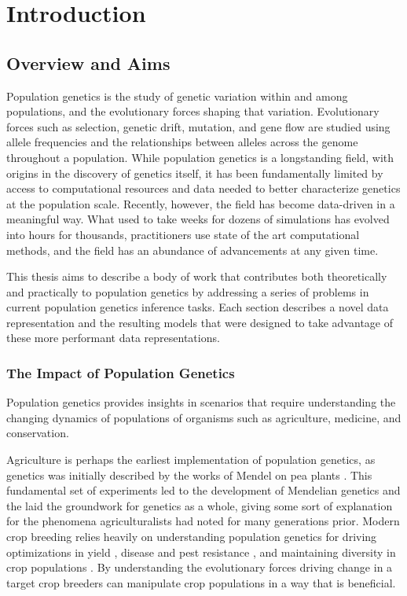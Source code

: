 \chapter{Introduction}

\section{Overview and Aims}

Population genetics is the study of genetic variation within and among populations, and the evolutionary forces shaping that variation. Evolutionary forces such as selection, genetic drift, mutation, and gene flow are studied using allele frequencies and the relationships between alleles across the genome throughout a population. While population genetics is a longstanding field, with origins in the discovery of genetics itself, it has been fundamentally limited by access to computational resources and data needed to better characterize genetics at the population scale. Recently, however, the field has become data-driven in a meaningful way. What used to take weeks for dozens of simulations has evolved into hours for thousands, practitioners use state of the art computational methods, and the field has an abundance of advancements at any given time.

This thesis aims to describe a body of work that contributes both theoretically and practically to population genetics by addressing a series of problems in current population genetics inference tasks. Each section describes a novel data representation and the resulting models that were designed to take advantage of these more performant data representations.

\subsection{The Impact of Population Genetics}

Population genetics provides insights in scenarios that require understanding the changing dynamics of populations of organisms such as agriculture, medicine, and conservation.

Agriculture is perhaps the earliest implementation of population genetics, as genetics was initially described by the works of Mendel on pea plants \cite{mendel_versuche_1866}. This fundamental set of experiments led to the development of Mendelian genetics and the laid the groundwork for genetics as a whole, giving some sort of explanation for the phenomena agriculturalists had noted for many generations prior. Modern crop breeding relies heavily on understanding population genetics for driving optimizations in yield \cite{maccaferri2008quantitative}, disease and pest resistance \cite{poland2009shades, derbyshireBioinformaticDetectionPositive2020, hawkinsEvolutionaryOriginsPesticide2019}, and maintaining diversity in crop populations \cite{hamblin_population_2011}. By understanding the evolutionary forces driving change in a target crop breeders can manipulate crop populations in a way that is beneficial. 

